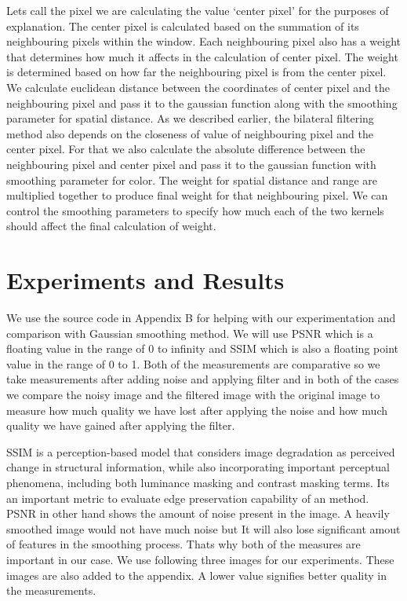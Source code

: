 \documentclass[a4paper, english]{article}
\begin{document}
Lets call the pixel we are calculating the value `center pixel' for the purposes of explanation. The center pixel is calculated based on the summation of its neighbouring pixels within the window. Each neighbouring pixel also has a weight that determines how much it affects in the calculation of center pixel. The weight is determined based on how far the neighbouring pixel is from the center pixel. We calculate euclidean distance between the coordinates of center pixel and the neighbouring pixel and pass it to the gaussian function along with the smoothing parameter for spatial distance. As we described earlier, the bilateral filtering method also depends on the closeness of value of neighbouring pixel and the center pixel. For that we also calculate the absolute difference between the neighbouring pixel and center pixel and pass it to the gaussian function with smoothing parameter for color. The weight for spatial distance and range are multiplied together to produce final weight for that neighbouring pixel. We can control the smoothing parameters to specify how much each of the two kernels should affect the final calculation of weight. 

\section{Experiments and Results}

We use the source code in Appendix B for helping with our experimentation and comparison with Gaussian smoothing method. We will use PSNR\cite{wiki:psnr} which is a floating value in the range of 0 to infinity and SSIM\cite{wang2003ssim} which is also a floating point value in the range of 0 to 1. Both of the measurements are comparative so we take measurements after adding noise and applying filter and in both of the cases we compare the noisy image and the filtered image with the original image to measure how much quality we have lost after applying the noise and how much quality we have gained after applying the filter.

SSIM is a perception-based model that considers image degradation as perceived change in structural information, while also incorporating important perceptual phenomena, including both luminance masking and contrast masking terms\cite{wiki:ssim_wiki}. Its an important metric to evaluate edge preservation capability of an method. PSNR in other hand shows the amount of noise present in the image. A heavily smoothed image would not have much noise but It will also lose significant amout of features in the smoothing process. Thats why both of the measures are important in our case. We use following three images for our experiments. These images are also added to the appendix. A lower value signifies better quality in the measurements.
\end{document}
